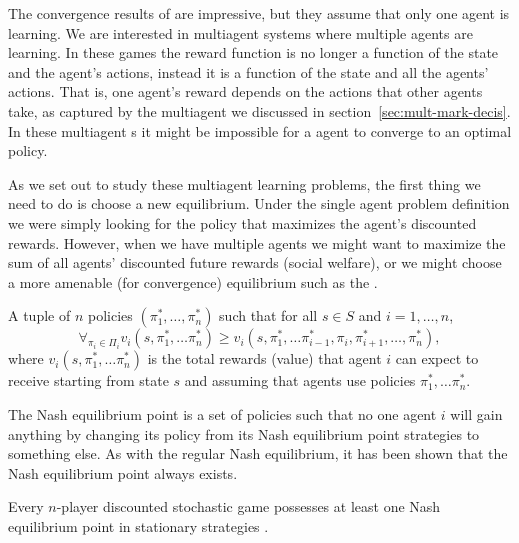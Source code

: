 \medskip

The convergence results of  are impressive, but they
assume that only one agent is learning. We are interested in
multiagent systems where multiple agents are learning. In these games
the reward function is no longer a function of the state and the
agent's actions, instead it is a function of the state and all the
agents' actions. That is, one agent's reward depends on the actions
that other agents take, as captured by the multiagent  we
discussed in section~\ref{sec:mult-mark-decis}. In these multiagent
s it might be impossible for a  agent to
converge to an optimal policy.

As we set out to study these multiagent learning problems, the first
thing we need to do is choose a new equilibrium. Under the single
agent problem definition we were simply looking for the policy that
maximizes the agent's discounted rewards. However, when we have
multiple agents we might want to maximize the sum of all agents'
discounted future rewards (social welfare), or we might choose a more
amenable (for convergence) equilibrium such as the .

\begin{definition} A tuple of $n$ policies
  $(\pi^*_1,\ldots,\pi_n^*)$ such that for all $s \in S$ and $i =
  1,\ldots,n$,
  \[\forall_{\pi_i \in \Pi_i} v_i(s,\pi_1^*,\ldots\pi_n^*) \geq v_i(s,\pi_1^*,\ldots
  \pi_{i-1}^*, \pi_i, \pi_{i+1}^*,\ldots,\pi_n^*), \]
  where $v_i(s,\pi_1^*,\ldots\pi_n^*)$ is the total rewards (value) that
  agent $i$ can expect to receive starting from state $s$ and assuming
  that agents use policies $\pi_1^*,\ldots\pi_n^*$.
\end{definition}
The Nash equilibrium point is a set of policies such that no one agent
$i$ will gain anything by changing its policy from its Nash
equilibrium point strategies to something else.  As with the regular
Nash equilibrium, it has been shown that the Nash equilibrium point
always exists.

\begin{theorem} Every $n$-player
  discounted stochastic game possesses at least one Nash equilibrium
  point in stationary strategies \cite{hu03a}.
\end{theorem}

